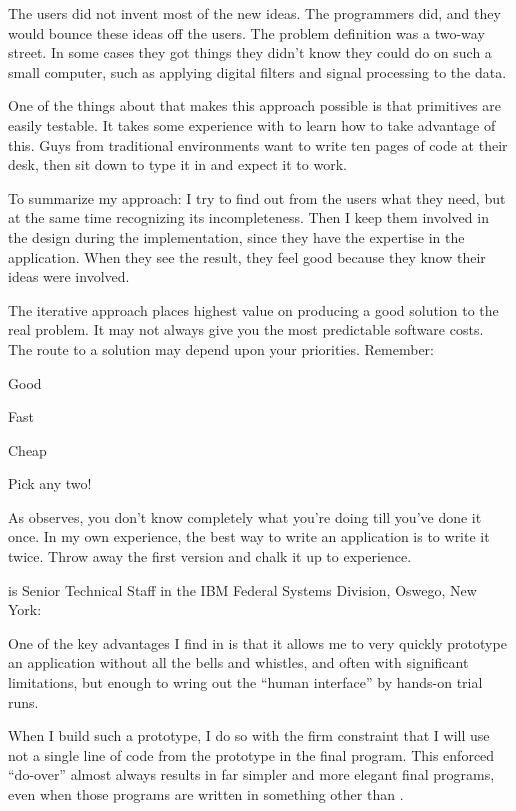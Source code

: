 \begin{interview}
\begin{tfquot}
The users did not invent most of the new ideas. The programmers did,
and they would bounce these ideas off the users. The problem
definition was a two-way street. In some cases they got things they
didn't know they could do on such a small computer, such as applying
digital filters and signal processing to the data.

One of the things about \Forth{} that makes this approach possible is
that primitives are easily testable. It takes some experience with
\Forth{} to learn how to take advantage of this. Guys from traditional
environments want to write ten pages of code at their desk, then sit
down to type it in and expect it to work.

To summarize my approach: I try to find out from the users what they
need, but at the same time recognizing its incompleteness. Then I keep
them involved in the design during the implementation, since they have
the expertise in the application.  When they see the result, they feel
good because they know their ideas were involved.

The iterative approach places highest value on producing a good
solution to the real problem. It may not always give you the most
predictable software costs. The route to a solution may depend upon
your priorities. Remember:
\begin{list}{}{}
\item Good
\item Fast
\item Cheap
\end{list}
Pick any two!
\end{tfquot}
\end{interview}

\noindent As  observes, you don't know completely what
you're doing till you've done it once. In my own experience, the best way
to write an application is to write it twice. Throw away the first
version and chalk it up to experience.%
%
\begin{interview}
\noindent {} is Senior Technical Staff in the IBM
Federal Systems Division, Oswego, New York:

\begin{tfquot}
One of the key advantages I find in \Forth{} is that it allows me to
very quickly prototype an application without all the bells and
whistles, and often with significant limitations, but enough to wring
out the ``human interface'' by hands-on trial runs.

When I build such a prototype, I do so with the firm constraint that I
will use not a single line of code from the prototype in the final
program. This enforced ``do-over'' almost always results in far
simpler and more elegant final programs, even when those programs are
written in something other than \Forth{}.
\end{tfquot}
\end{interview}%

